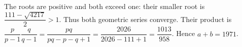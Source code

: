 The roots are positive and both exceed one: their smaller root is $\dfrac{111-\sqrt{4217}}{2}>1$. Thus both geometric series converge. Their product is $\dfrac{p}{p-1}\dfrac{q}{q-1}=\dfrac{pq}{pq-p-q+1}=\dfrac{2026}{2026-111+1}=\dfrac{1013}{958}$. Hence $\boxed{a+b=1971}$.
